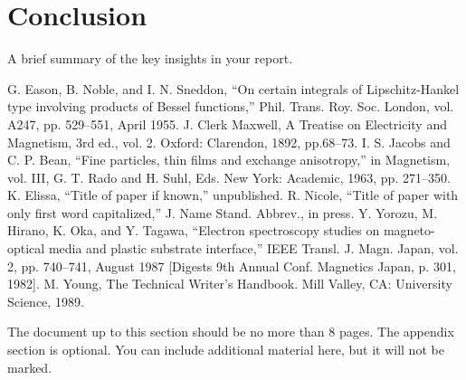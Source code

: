 \documentclass[conference]{IEEEtran}
\begin{document}
\section{Conclusion}
{\color{blue}A brief summary of the key insights in your report.}

\begin{thebibliography}{00}
 G. Eason, B. Noble, and I. N. Sneddon, ``On certain integrals of Lipschitz-Hankel type involving products of Bessel functions,'' Phil. Trans. Roy. Soc. London, vol. A247, pp. 529--551, April 1955.
 J. Clerk Maxwell, A Treatise on Electricity and Magnetism, 3rd ed., vol. 2. Oxford: Clarendon, 1892, pp.68--73.
 I. S. Jacobs and C. P. Bean, ``Fine particles, thin films and exchange anisotropy,'' in Magnetism, vol. III, G. T. Rado and H. Suhl, Eds. New York: Academic, 1963, pp. 271--350.
 K. Elissa, ``Title of paper if known,'' unpublished.
 R. Nicole, ``Title of paper with only first word capitalized,'' J. Name Stand. Abbrev., in press.
 Y. Yorozu, M. Hirano, K. Oka, and Y. Tagawa, ``Electron spectroscopy studies on magneto-optical media and plastic substrate interface,'' IEEE Transl. J. Magn. Japan, vol. 2, pp. 740--741, August 1987 [Digests 9th Annual Conf. Magnetics Japan, p. 301, 1982].
 M. Young, The Technical Writer's Handbook. Mill Valley, CA: University Science, 1989.
\end{thebibliography}

\appendix
{\color{blue}The document up to this section should be no more than 8 pages. The appendix section is optional. You can include additional material here, but it will not be marked.}
\end{document}
